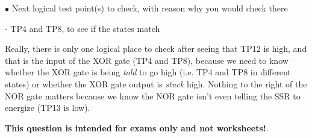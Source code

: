 \medskip
\goodbreak
\item{$\bullet$} Next logical test point(s) to check, with reason why you would check there
\item{-} TP4 and TP8, to see if the states match
\medskip

Really, there is only one logical place to check after seeing that TP12 is high, and that is the input of the XOR gate (TP4 and TP8), because we need to know whether the XOR gate is being {\it told} to go high (i.e. TP4 and TP8 in different states) or whether the XOR gate output is {\it stuck} high.  Nothing to the right of the NOR gate matters because we know the NOR gate isn't even telling the SSR to energize (TP13 is low).







{\bf This question is intended for exams only and not worksheets!}.




